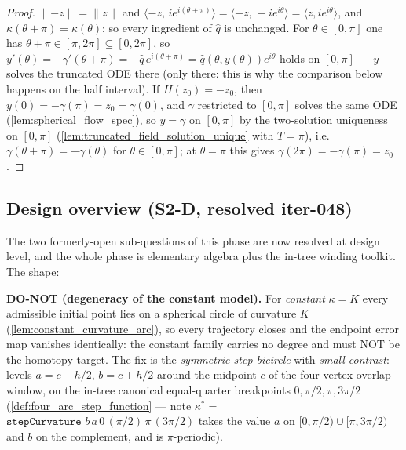 \begin{proof}

\leanok
  $\|{-z}\|=\|z\|$ and $\langle -z,\,ie^{i(\theta+\pi)}\rangle=\langle -z,\,-ie^{i\theta}
  \rangle=\langle z,ie^{i\theta}\rangle$, and $\kappa(\theta+\pi)=\kappa(\theta)$; so
  every ingredient of $\hat q$ is unchanged. For $\theta\in[0,\pi]$ one has
  $\theta+\pi\in[\pi,2\pi]\subseteq[0,2\pi]$, so
  $y'(\theta)=-\gamma'(\theta+\pi)=-\hat q\,e^{i(\theta+\pi)}=\hat q(\theta,y(\theta))e^{i\theta}$
  holds on $[0,\pi]$ — $y$ solves the truncated ODE there (only there: this is why the
  comparison below happens on the half interval). If $H(z_0)=-z_0$, then
  $y(0)=-\gamma(\pi)=z_0=\gamma(0)$, and $\gamma$ restricted to $[0,\pi]$ solves the same ODE
  (\cref{lem:spherical_flow_spec}), so $y=\gamma$ on $[0,\pi]$ by the two-solution
  uniqueness on $[0,\pi]$ (\cref{lem:truncated_field_solution_unique} with $T=\pi$),
  i.e.\ $\gamma(\theta+\pi)=-\gamma(\theta)$ for $\theta\in[0,\pi]$; at $\theta=\pi$ this gives
  $\gamma(2\pi)=-\gamma(\pi)=z_0$.
\end{proof}

\subsection*{Design overview (S2-D, resolved iter-048)}

The two formerly-open sub-questions of this phase are now resolved at design level, and
the whole phase is elementary algebra plus the in-tree winding toolkit. The shape:

\textbf{DO-NOT (degeneracy of the constant model).} For \emph{constant} $\kappa=K$ every
admissible initial point lies on a spherical circle of curvature $K$
(\cref{lem:constant_curvature_arc}), so every trajectory closes and the endpoint error
map vanishes identically: the constant family carries no degree and must NOT be the
homotopy target. The fix is the \emph{symmetric step bicircle} with \emph{small
contrast}: levels $a=c-h/2$, $b=c+h/2$ around the midpoint $c$ of the four-vertex
overlap window, on the in-tree canonical equal-quarter breakpoints $0,\pi/2,\pi,3\pi/2$
(\cref{def:four_arc_step_function} — note $\kappa^\ast=$
$\texttt{stepCurvature } b\,a\,0\,(\pi/2)\,\pi\,(3\pi/2)$ takes the value $a$ on
$[0,\pi/2)\cup[\pi,3\pi/2)$ and $b$ on the complement, and is $\pi$-periodic).

